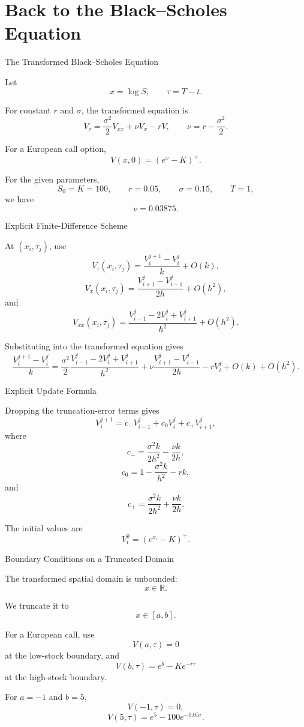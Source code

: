 \documentclass{beamer}
\begin{document}
\section[A2Q5]{Back to the Black--Scholes Equation}

\begin{frame}{The Transformed Black--Scholes Equation}

Let
\[
x=\log S,
\qquad
\tau=T-t.
\]

For constant \(r\) and \(\sigma\), the transformed equation is
\[
V_\tau
=
\frac{\sigma^2}{2}V_{xx}
+
\nu V_x
-rV,
\qquad
\nu=r-\frac{\sigma^2}{2}.
\]

For a European call option,
\[
V(x,0)=(e^x-K)^+.
\]

For the given parameters,
\[
S_0=K=100,
\qquad
r=0.05,
\qquad
\sigma=0.15,
\qquad
T=1,
\]
we have
\[
\nu=0.03875.
\]

\end{frame}


\begin{frame}{Explicit Finite-Difference Scheme}

At \((x_i,\tau_j)\), use
\[
V_\tau(x_i,\tau_j)
=
\frac{V_i^{j+1}-V_i^j}{k}
+
O(k),
\]
\[
V_x(x_i,\tau_j)
=
\frac{V_{i+1}^j-V_{i-1}^j}{2h}
+
O(h^2),
\]
and
\[
V_{xx}(x_i,\tau_j)
=
\frac{V_{i-1}^j-2V_i^j+V_{i+1}^j}{h^2}
+
O(h^2).
\]

Substituting into the transformed equation gives
\[
\frac{V_i^{j+1}-V_i^j}{k}
=
\frac{\sigma^2}{2}
\frac{V_{i-1}^j-2V_i^j+V_{i+1}^j}{h^2}
+
\nu
\frac{V_{i+1}^j-V_{i-1}^j}{2h}
-rV_i^j
+
O(k)+O(h^2).
\]

\end{frame}


\begin{frame}{Explicit Update Formula}

Dropping the truncation-error terms gives
\[
V_i^{j+1}
=
c_-V_{i-1}^j
+
c_0V_i^j
+
c_+V_{i+1}^j,
\]
where
\[
c_-
=
\frac{\sigma^2k}{2h^2}
-
\frac{\nu k}{2h},
\]
\[
c_0
=
1-\frac{\sigma^2k}{h^2}-rk,
\]
and
\[
c_+
=
\frac{\sigma^2k}{2h^2}
+
\frac{\nu k}{2h}.
\]

The initial values are
\[
V_i^0=(e^{x_i}-K)^+.
\]

\end{frame}


\begin{frame}{Boundary Conditions on a Truncated Domain}

The transformed spatial domain is unbounded:
\[
x\in\mathbb{R}.
\]

We truncate it to
\[
x\in[a,b].
\]

For a European call, use
\[
V(a,\tau)=0
\]
at the low-stock boundary, and
\[
V(b,\tau)=e^b-Ke^{-r\tau}
\]
at the high-stock boundary.

For \(a=-1\) and \(b=5\),
\[
V(-1,\tau)=0,
\]
\[
V(5,\tau)=e^5-100e^{-0.05\tau}.
\]

\end{frame}
\end{document}
